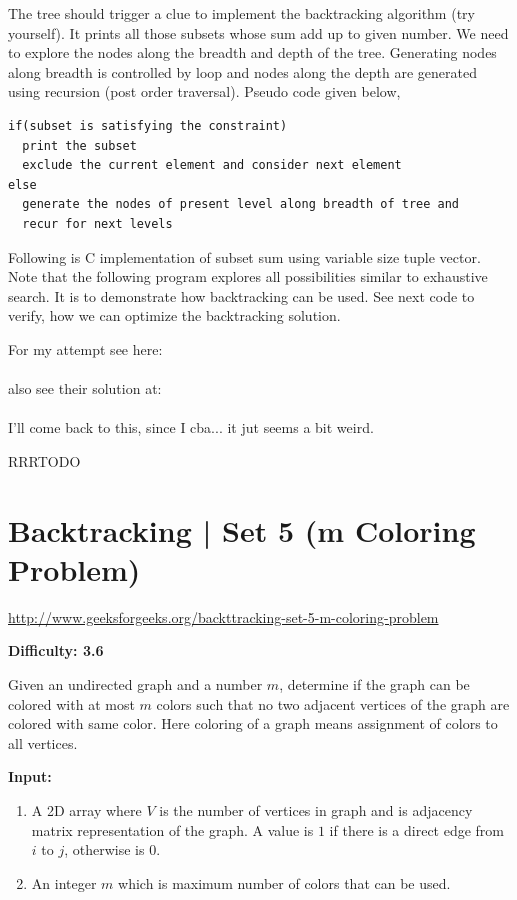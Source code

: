 The tree should trigger a clue to implement the backtracking algorithm (try
yourself). It prints all those subsets whose sum add up to given number. We
need to explore the nodes along the breadth and depth of the tree.
Generating nodes along breadth is controlled by loop and nodes along the
depth are generated using recursion (post order traversal). Pseudo code
given below,
\begin{lstlisting}[style=raygeneric]
if(subset is satisfying the constraint)
  print the subset
  exclude the current element and consider next element
else
  generate the nodes of present level along breadth of tree and
  recur for next levels
\end{lstlisting}
Following is C implementation of subset sum using variable size tuple
vector. Note that the following program explores all possibilities similar
to exhaustive search. It is to demonstrate how backtracking can be used. See
next code to verify, how we can optimize the backtracking solution.

For my attempt see here:\\
\\
also see their solution at:\\
\\

I'll come back to this, since I cba... it jut seems a bit weird.

RRRTODO


\section{Backtracking | Set 5 (m Coloring Problem)
  \label{secGFGBktrckSet5mColorProb}}

\url{http://www.geeksforgeeks.org/backttracking-set-5-m-coloring-problem}

\textbf{Difficulty: 3.6}

Given an undirected graph and a number $m$, determine if the graph can be
colored with at most $m$ colors such that no two adjacent vertices of the
graph are colored with same color. Here coloring of a graph means assignment
of colors to all vertices.

\noindent{}\textbf{Input:}\\
\begin{enumerate}[label=\textbf{\arabic*.}]
\item A 2D array  where $V$ is the number of vertices in
  graph and  is adjacency matrix representation of the
  graph. A value  is $1$ if there is a direct edge from $i$
  to $j$, otherwise  is $0$.
\item An integer $m$ which is maximum number of colors that can be used.
\end{enumerate}

